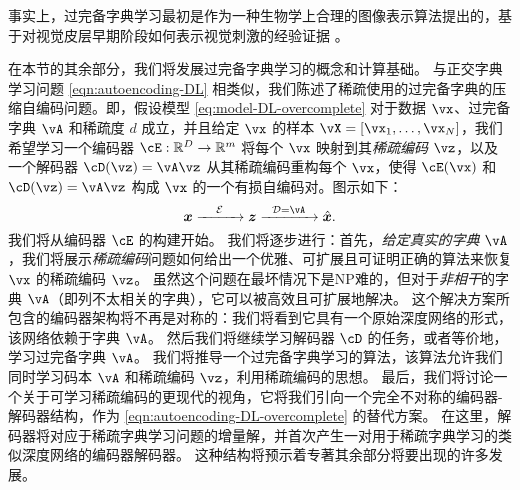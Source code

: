 \documentclass[../../book-main_zh.tex]{subfiles}
\begin{document}
事实上，过完备字典学习最初是作为一种生物学上合理的图像表示算法提出的，基于对视觉皮层早期阶段如何表示视觉刺激的经验证据 \cite{Olshausen1996-ap,Olshausen1997-yv}。

在本节的其余部分，我们将发展过完备字典学习的概念和计算基础。
与正交字典学习问题 \eqref{eqn:autoencoding-DL} 相类似，我们陈述了稀疏使用的过完备字典的压缩自编码问题。即，假设模型 \eqref{eq:model-DL-overcomplete} 对于数据 \(\vx\)、过完备字典 \(\vA\) 和稀疏度 \(d\) 成立，并且给定 \(\vx\) 的样本 \(\vX = [\vx_1, \dots, \vx_N]\)，我们希望学习一个编码器 \(\cE : \R^D \to \R^m\) 将每个 \(\vx\) 映射到其\textit{稀疏编码} \(\vz\)，以及一个解码器 \(\cD(\vz) = \vA \vz\) 从其稀疏编码重构每个 \(\vx\)，使得 \(\cE(\vx)\) 和 \(\cD(\vz) = \vA\vz\) 构成 \(\vx\) 的一个有损自编码对。图示如下：
\begin{equation}
\x \xrightarrow{\hspace{4mm} \mathcal{E} \hspace{4mm}}  \z \xrightarrow{\hspace{2mm} \mathcal{D} = \vA \hspace{2mm}}   \hat{\x}.  
\label{eqn:autoencoding-DL-overcomplete}
\end{equation}    
我们将从编码器 $\cE$ 的构建开始。
我们将逐步进行：首先，\textit{给定真实的字典 $\vA$}，我们将展示\textit{稀疏编码}问题如何给出一个优雅、可扩展且可证明正确的算法来恢复 $\vx$ 的稀疏编码 $\vz$。
虽然这个问题在最坏情况下是NP难的，但对于\textit{非相干}的字典 $\vA$（即列不太相关的字典），它可以被高效且可扩展地解决。
这个解决方案所包含的编码器架构将不再是对称的：我们将看到它具有一个原始深度网络的形式，该网络依赖于字典 $\vA$。
然后我们将继续学习解码器 $\cD$ 的任务，或者等价地，学习过完备字典 $\vA$。
我们将推导一个过完备字典学习的算法，该算法允许我们
同时学习码本 $\vA$ 和稀疏编码 $\vz$，利用稀疏编码的思想。
最后，我们将讨论一个关于可学习稀疏编码的更现代的视角，它将我们引向一个完全不对称的编码器-解码器结构，作为 \eqref{eqn:autoencoding-DL-overcomplete} 的替代方案。
在这里，解码器将对应于稀疏字典学习问题的增量解，并首次产生一对用于稀疏字典学习的类似深度网络的编码器解码器。
这种结构将预示着专著其余部分将要出现的许多发展。
\end{document}
